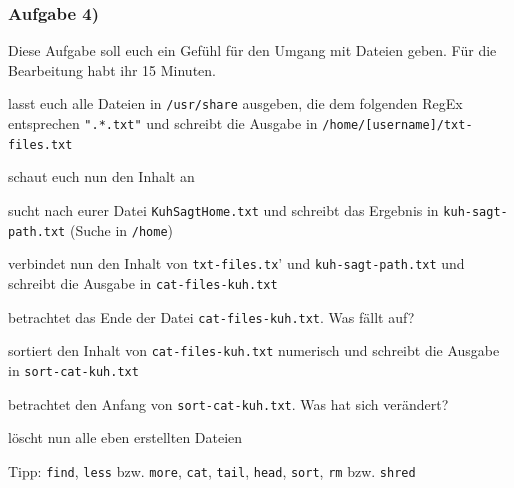 \documentclass[12pt,utf8, handout]{beamer}
\begin{document}
\begin{frame}
\frametitle{Aufgabe 4)}
Diese Aufgabe soll euch ein Gefühl für den Umgang mit Dateien geben. Für die Bearbeitung habt ihr 15 Minuten.
\begin{itemize}
	{\footnotesize
	\item lasst euch alle Dateien in \texttt{/usr/share} ausgeben, die dem folgenden RegEx entsprechen \texttt{".*.txt"} und schreibt die Ausgabe in \texttt{/home/[username]/txt-files.txt}
	\item schaut euch nun den Inhalt an
	\item sucht nach eurer Datei \texttt{KuhSagtHome.txt} und schreibt das Ergebnis in \texttt{kuh-sagt-path.txt} (Suche in \texttt{/home})
	\item verbindet nun den Inhalt von \texttt{txt-files.tx}' und \texttt{kuh-sagt-path.txt} und schreibt die Ausgabe in \texttt{cat-files-kuh.txt}
	\item betrachtet das Ende der Datei \texttt{cat-files-kuh.txt}. Was fällt auf?
	\item sortiert den Inhalt von \texttt{cat-files-kuh.txt} numerisch und schreibt die Ausgabe in \texttt{sort-cat-kuh.txt}
	\item betrachtet den Anfang von \texttt{sort-cat-kuh.txt}. Was hat sich verändert?
	\item löscht nun alle eben erstellten Dateien
	}
\end{itemize}
{\scriptsize Tipp: \texttt{find}, \texttt{less} bzw. \texttt{more}, \texttt{cat}, \texttt{tail}, \texttt{head}, \texttt{sort}, \texttt{rm} bzw. \texttt{shred}}
\end{frame}
\end{document}
